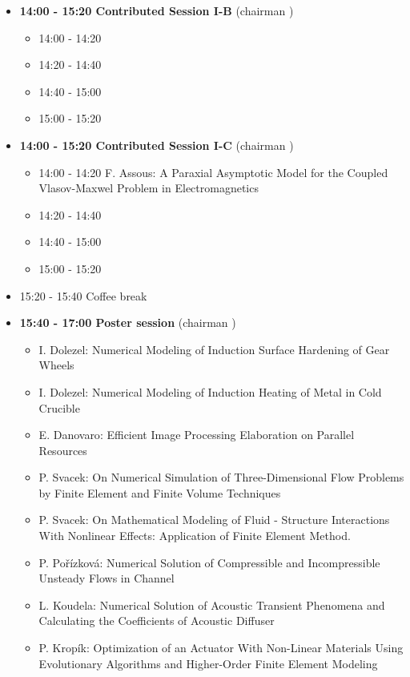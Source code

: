 \documentclass[10pt, A4]{article}%
\begin{document}
\begin{itemize}
\begin{itemize}
  \end{itemize}
  \item {\bf 14:00 - 15:20 Contributed Session I-B} (chairman ) 
  \begin{itemize}
    \item 14:00 - 14:20 
    \item 14:20 - 14:40 
    \item 14:40 - 15:00 
    \item 15:00 - 15:20 
  \end{itemize}
    \item {\bf 14:00 - 15:20 Contributed Session I-C} (chairman ) 
  \begin{itemize}
    \item 14:00 - 14:20 {F. Assous}: {A Paraxial Asymptotic Model for the Coupled Vlasov-Maxwel Problem in Electromagnetics}
    \item 14:20 - 14:40 
    \item 14:40 - 15:00 
    \item 15:00 - 15:20 
  \end{itemize}
  \item 15:20 - 15:40 Coffee break
  \item {\bf 15:40 - 17:00 Poster session} (chairman )
  \begin{itemize}
    \item {I. Dolezel}: {Numerical Modeling of Induction Surface Hardening of Gear Wheels}
    \item {I. Dolezel}: {Numerical Modeling of Induction Heating of Metal in Cold Crucible}
    \item {E. Danovaro}: {Efficient Image Processing Elaboration on Parallel Resources}
	\item {P. Svacek}: {On Numerical Simulation of Three-Dimensional Flow Problems by Finite Element and Finite Volume Techniques}
	\item {P. Svacek}: {On Mathematical Modeling of Fluid - Structure Interactions With Nonlinear Effects: Application of Finite Element Method.}
    \item {P. Pořízková}: {Numerical Solution of Compressible and Incompressible Unsteady Flows in Channel}
    \item {L. Koudela}: {Numerical Solution of Acoustic Transient Phenomena and Calculating the Coefficients of Acoustic Diffuser}
    \item {P. Kropík}: {Optimization of an Actuator With Non-Linear Materials Using Evolutionary Algorithms and Higher-Order Finite Element Modeling}
  \end{itemize}
   
\end{itemize}
\end{document}
